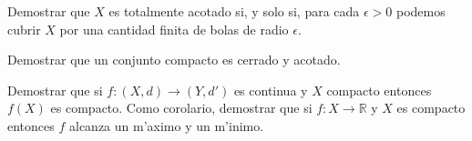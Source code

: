\begin{ejercicio}\label{ejer,precantfinibolas} Demostrar que $X$ es totalmente acotado si, y
solo si, para cada $\epsilon>0$ podemos cubrir $X$ por una cantidad
finita de bolas de radio $\epsilon$.
\end{ejercicio}

\begin{ejercicio} Demostrar que un conjunto compacto es cerrado y
acotado.
\end{ejercicio}

\begin{ejercicio} Demostrar que si $f:(X,d)\to (Y,d')$ es continua
y $X$ compacto entonces $f(X)$ es compacto. Como corolario,
demostrar que si $f:X\to\mathbb{R}$ y $X$ es compacto entonces $f$
alcanza un m'aximo y un m'inimo.
\end{ejercicio}

